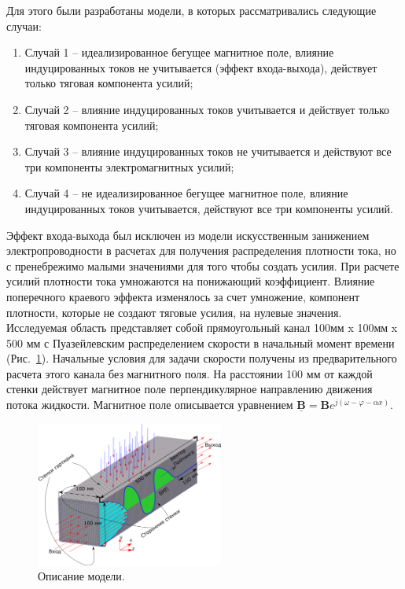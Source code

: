 Для этого были разработаны модели, в которых рассматривались следующие случаи:

\begin{enumerate}
    \item Случай 1 -- идеализированное бегущее магнитное поле, влияние индуцированных токов не учитывается (эффект входа-выхода), действует только тяговая компонента усилий;
    \item Случай 2 --  влияние индуцированных токов учитывается и действует только тяговая компонента усилий;
    \item Случай 3 -- влияние индуцированных токов не учитывается и действуют все три компоненты электромагнитных усилий;
    \item Случай 4 -- не идеализированное бегущее магнитное поле, влияние индуцированных токов учитывается, действуют все три компоненты усилий. 
\end{enumerate}

Эффект входа-выхода был исключен из модели искусственным занижением электропроводности в расчетах для получения распределения плотности тока, но с пренебрежимо малыми значениями для того чтобы создать усилия. При расчете усилий плотности тока умножаются на понижающий коэффициент. Влияние поперечного краевого эффекта изменялось за счет умножение, компонент плотности, которые не создают тяговые усилия, на нулевые значения. Исследуемая область представляет собой прямоугольный канал 100мм x 100мм x 500 мм с Пуазейлевским распределением скорости в начальный момент времени (Рис.~\ref{fig:model}). Начальные условия для задачи скорости получены из предварительного расчета этого канала без магнитного поля. На расстоянии 100 мм от каждой стенки действует магнитное поле перпендикулярное направлению движения потока жидкости. Магнитное поле описывается уравнением $\underline{\mathbf{B}} = \mathbf{B} e^{j(\omega - \varphi - \alpha x)}$.
\begin{figure}
	\centering
	\includegraphics[width=0.55\textwidth]{Synopsis/images/part3/Description_ru.png}
	\caption{Описание модели.}
	\label{fig:model}	
\end{figure}


